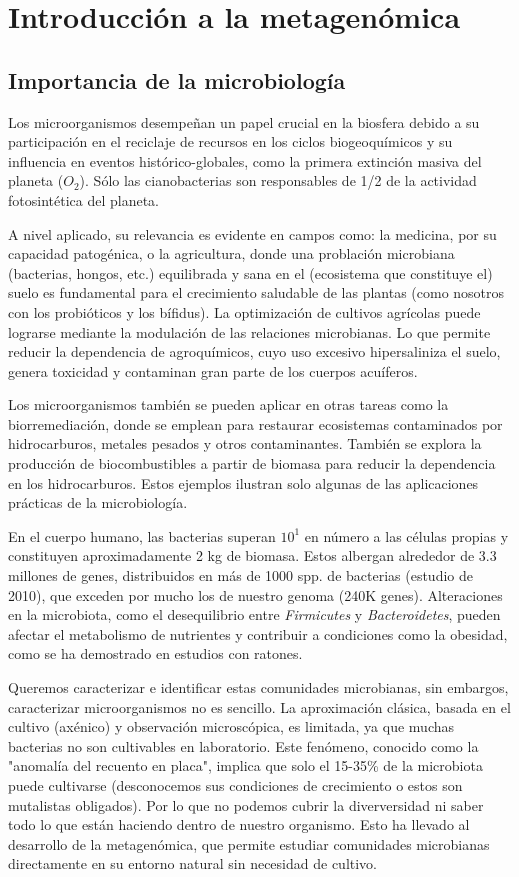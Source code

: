 \chapter{Introducción a la metagenómica}
\section{Importancia de la microbiología}
Los microorganismos desempeñan un papel crucial en la biosfera debido a su participación en el reciclaje de recursos en los ciclos biogeoquímicos y su influencia en eventos histórico-globales, como la primera extinción masiva del planeta ($O_2$). Sólo las cianobacterias son responsables de 1/2 de la actividad fotosintética del planeta.

A nivel aplicado, su relevancia es evidente en campos como: la medicina, por su capacidad patogénica, o la agricultura, donde una problación microbiana (bacterias, hongos, etc.) equilibrada y sana en el (ecosistema que constituye el) suelo es fundamental para el crecimiento saludable de las plantas (como nosotros con los probióticos y los bífidus). La optimización de cultivos agrícolas puede lograrse mediante la modulación de las relaciones microbianas. Lo que permite reducir la dependencia de agroquímicos, cuyo uso excesivo hipersaliniza el suelo, genera toxicidad y contaminan gran parte de los cuerpos acuíferos. 

Los microorganismos también se pueden aplicar en otras tareas como la biorremediación, donde se emplean para restaurar ecosistemas contaminados por hidrocarburos, metales pesados y otros contaminantes. También se explora la producción de biocombustibles a partir de biomasa para reducir la dependencia en los hidrocarburos. Estos ejemplos ilustran solo algunas de las aplicaciones prácticas de la microbiología.

En el cuerpo humano, las bacterias superan $10^1$ en número a las células propias y constituyen aproximadamente 2 kg de biomasa. Estos albergan alrededor de 3.3 millones de genes, distribuidos en más de 1000 spp. de bacterias (estudio de 2010), que exceden por mucho los de nuestro genoma (240K genes). Alteraciones en la microbiota, como el desequilibrio entre \textit{Firmicutes} y \textit{Bacteroidetes}, pueden afectar el metabolismo de nutrientes y contribuir a condiciones como la obesidad, como se ha demostrado en estudios con ratones. 

Queremos caracterizar e identificar estas comunidades microbianas, sin embargos, caracterizar microorganismos no es sencillo. La aproximación clásica, basada en el cultivo (axénico) y observación microscópica, es limitada, ya que muchas bacterias no son cultivables en laboratorio. Este fenómeno, conocido como la "anomalía del recuento en placa", implica que solo el 15-35\% de la microbiota puede cultivarse (desconocemos sus condiciones de crecimiento o estos son mutalistas obligados). Por lo que no podemos cubrir la diverversidad ni saber todo lo que están haciendo dentro de nuestro organismo. Esto ha llevado al desarrollo de la metagenómica, que permite estudiar comunidades microbianas directamente en su entorno natural sin necesidad de cultivo.

